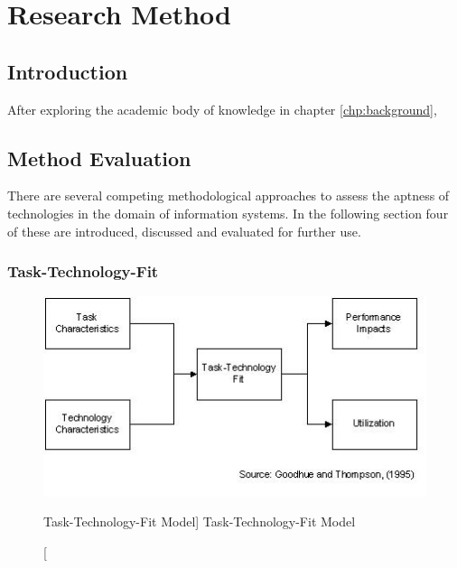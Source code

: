 \chapter{Research Method}\label{chp:researchMethod}


\section{Introduction}

After exploring the academic body of knowledge in chapter \ref{chp:background}, 


\section{Method Evaluation}

There are several competing methodological approaches to assess the aptness of technologies in the domain of information systems. In the following section four of these are introduced, discussed and evaluated for further use.

    
    \subsection{Task-Technology-Fit}
    \begin{figure}[ht]
        \includegraphics[width=0.7\linewidth]{images/methodology/ttf.jpg}\centering
        \caption
        [Task-Technology-Fit Model]
        {Task-Technology-Fit Model \cite{Goodhue1995Task-TechnologyPerformance}}
    \end{figure}
    
